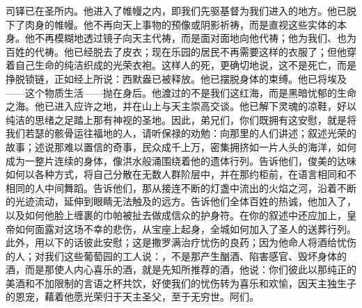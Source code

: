司铎已在圣所内。他进入了帷幔之内，即我们先驱基督为我们进入的地方。他已脱下了肉身的帷幔。他不再向天上事物的预像或阴影祈祷，而是直视这些实体的本身。他不再模糊地透过镜子向天主代祷，而是面对面地向他代祷；他为我们、也为百姓的代祷。他已经脱去了皮衣；现在乐园的居民不再需要这样的衣服了；但他穿着自己生命的纯洁织成的光荣衣袍。这样人的死，更确切地说，这不是死亡，而是挣脱锁链，正如经上所说：西默盎已被释放。他已摆脱身体的束缚。他已将埃及——这个物质生活——抛在身后。他渡过的不是我们这红海，而是黑暗忧郁的生命之海。他已进入应许之地，并在山上与天主崇高交谈。他已解下灵魂的凉鞋，好以纯洁的思绪之足踏上那有神视的圣地。因此，弟兄们，你们既拥有这安慰，就是将我们若瑟的骸骨运往福地的人，请听保禄的劝勉：向那里的人们讲述；叙述光荣的故事；述说那难以置信的奇事，民众成千上万，密集拥挤如一片人头的海洋，如何成为一整片连续的身体，像洪水般涌围绕着他的遗体行列。告诉他们，俊美的达味如何以各种方式，将自己分散在无数人群阶层中，并在那约柜前，在语言相同和不相同的人中间舞蹈。告诉他们，那从接连不断的灯盏中流出的火焰之河，沿着不断的光迹流动，延伸到眼睛无法触及的远方。告诉他们全体百姓的热诚，他加入了，以及如何他脸上缠裹的巾帕被扯去做成信众的护身符。在你的叙述中还应加上，皇帝如何面露对这场不幸的悲伤，从宝座上起身，全城如何加入了圣人的送葬行列。此外，用以下的话彼此安慰；这是撒罗满治疗忧伤的良药；因为他命人将酒给忧伤的人；对我们这些葡萄园的工人说：，不是那产生酗酒、陷害感官、毁坏身体的酒，而是那使人内心喜乐的酒，就是先知所推荐的酒，他说：你们彼此以那纯正的美酒和不加限制的言语之杯共饮，好使我们的忧伤转为喜乐和欢愉，因天主独生子的恩宠，藉着他愿光荣归于天主圣父，至于无穷世。阿们。\par

